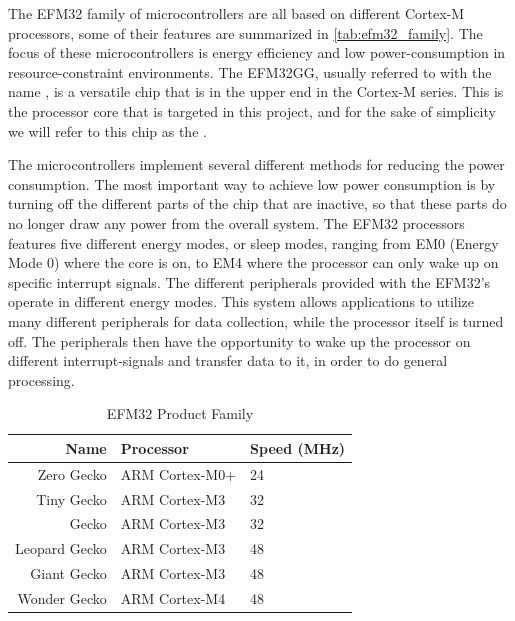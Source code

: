 The EFM32 family of microcontrollers are all based on different Cortex-M processors, some of their features are summarized in \autoref{tab:efm32_family}.
The focus of these microcontrollers is energy efficiency and low power-consumption in resource-constraint environments.
The EFM32GG, usually referred to with the name , is a versatile chip that is in the upper end in the Cortex-M series.
This is the processor core that is targeted in this project, and for the sake of simplicity we will refer to this chip as the {\gecko}.

The microcontrollers implement several different methods for reducing the power consumption.
The most important way to achieve low power consumption is by turning off the different parts of the chip that are inactive, so that these parts do no longer draw any power from the overall system.
The EFM32 processors features five different energy modes, or sleep modes, ranging from EM0 (Energy Mode 0) where the core is on, to EM4 where the processor can only wake up on specific interrupt signals.
The different peripherals provided with the EFM32's operate in different energy modes.
This system allows applications to utilize many different peripherals for data collection, while the processor itself is turned off.
The peripherals then have the opportunity to wake up the processor on different interrupt-signals and transfer data to it, in order to do general processing.

\begin{table}[b]
\begin{center}
    \begin{tabular}{r|l|l}
    \textbf{Name} & \textbf{Processor} & \textbf{Speed (MHz)} \\
    \hline
    Zero Gecko    & ARM Cortex-M0+ & 24 \\
    Tiny Gecko    & ARM Cortex-M3  & 32 \\
    Gecko         & ARM Cortex-M3  & 32 \\
    Leopard Gecko & ARM Cortex-M3  & 48 \\
    Giant Gecko   & ARM Cortex-M3  & 48 \\
    Wonder Gecko  & ARM Cortex-M4  & 48 \\
    \hline
    \end{tabular}
\end{center}
\caption{EFM32 Product Family \cite{web:silabs}}
\label{tab:efm32_family}
\end{table}

